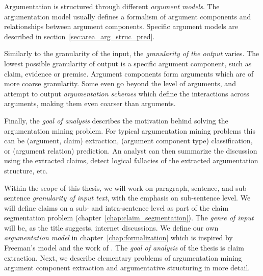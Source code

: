 Argumentation is structured through different \emph{argument models}.  The
argumentation model usually defines a formalism of argument components and
relationships between argument components.  Specific argument models are
described in section~\ref{sec:area_arg_struc_pred}.

Similarly to the granularity of the input, the \emph{granularity of the output}
varies. The lowest possible granularity of output is a specific argument
component, such as claim, evidence or premise. Argument components form arguments
which are of more coarse granularity. Some even go beyond the level of arguments, 
and attempt to output \emph{argumentation schemes} \citep{feng2011classifying} which
define the interactions across arguments, making them even coarser than arguments. 

Finally, the \emph{goal of analysis} describes the motivation behind solving
the argumentation mining problem. For typical argumentation mining problems
this can be (argument, claim) extraction, (argument component type)
classification, or (argument relation) prediction. An analyst can then 
summarize the discussion using the extracted claims, detect logical fallacies
of the extracted argumentation structure, etc.

Within the scope of this thesis, we will work on paragraph, sentence, and
sub-sentence \emph{granularity of input text}, with the emphasis on
sub-sentence level. We will define claims on a sub- and intra-sentence level as
part of the claim segmentation problem (chapter~\ref{chap:claim_segmentation}).
The \emph{genre of input} will be, as the title suggests, internet discussions.
We define our own \emph{argumentation model} in
chapter~\ref{chap:formalization} which is inspired by Freeman's model and the
work of \citet{hashimoto2012excitatory}.
The \emph{goal of analysis} of the thesis is claim extraction.
Next, we describe elementary problems of argumentation mining
argument component extraction and argumentative structuring 
in more detail.



